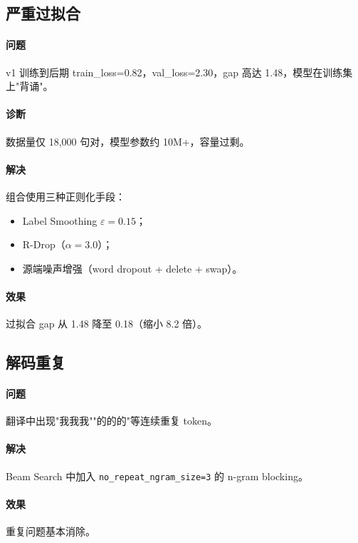 \documentclass[12pt, a4paper]{ctexart}
\begin{document}
\subsection{严重过拟合}

\paragraph{问题} v1 训练到后期 train\_loss=0.82，val\_loss=2.30，gap 高达 1.48，模型在训练集上"背诵"。

\paragraph{诊断} 数据量仅 18,000 句对，模型参数约 10M+，容量过剩。

\paragraph{解决} 组合使用三种正则化手段：
\begin{itemize}[nosep]
  \item Label Smoothing $\varepsilon = 0.15$；
  \item R-Drop（$\alpha = 3.0$）；
  \item 源端噪声增强（word dropout + delete + swap）。
\end{itemize}

\paragraph{效果} 过拟合 gap 从 1.48 降至 0.18（缩小 8.2 倍）。

\subsection{解码重复}

\paragraph{问题} 翻译中出现"我我我""的的的"等连续重复 token。

\paragraph{解决} Beam Search 中加入 \texttt{no\_repeat\_ngram\_size=3} 的 n-gram blocking。

\paragraph{效果} 重复问题基本消除。
\end{document}
